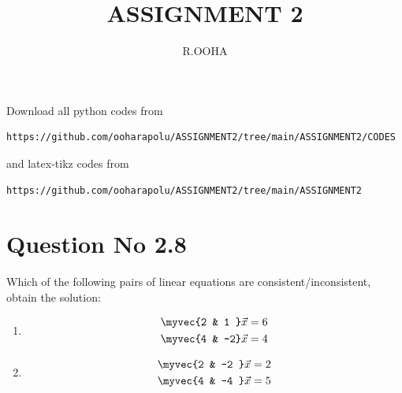 \documentclass[journal,12pt,twocolumn]{IEEEtran}
\begin{document}
     \def\rightbox#1{\makebox[0in][r]{#1}}
     \def\centbox#1{\makebox[0in]{#1}}
     \def\topbox#1{\raisebox{-\baselineskip}[0in][0in]{#1}}
     \def\midbox#1{\raisebox{-0.5\baselineskip}[0in][0in]{#1}}
\vspace{3cm}
\title{ASSIGNMENT 2}
\author{R.OOHA}
\maketitle
\newpage
\bigskip
\renewcommand{\thefigure}{\theenumi}
\renewcommand{\thetable}{\theenumi}
Download all python codes from 
\begin{lstlisting}
https://github.com/ooharapolu/ASSIGNMENT2/tree/main/ASSIGNMENT2/CODES
\end{lstlisting}
%
and latex-tikz codes from 
%
\begin{lstlisting}
https://github.com/ooharapolu/ASSIGNMENT2/tree/main/ASSIGNMENT2
\end{lstlisting}
%
\section{Question No 2.8}
Which of the following pairs of linear equations are consistent/inconsistent, obtain the solution:
%
\begin{enumerate}
\item
\begin{align}
\begin{split}
\myvec{2 & 1 }\vec{x}&=6
\\
\myvec{4 & -2}\vec{x}&=4 \label{1.0.1}
\end{split}
\end{align}
\item
\begin{align}
\begin{split}
\myvec{2 & -2 }\vec{x}&=2
\\
\myvec{4 & -4 }\vec{x}&=5 \label{1.0.2}
\end{split}
\end{align}
\end{enumerate}
%
\end{document}
